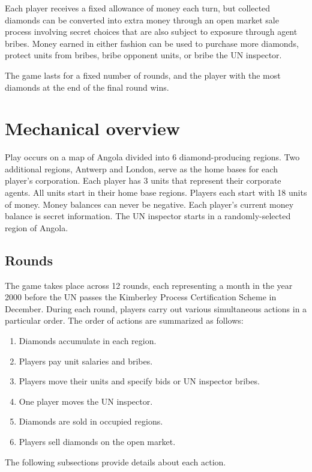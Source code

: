 Each player receives a fixed allowance of money each turn, but collected diamonds can be converted into extra money through an open market sale process involving secret choices that are also subject to exposure through agent bribes.  Money earned in either fashion can be used to purchase more diamonds, protect units from bribes, bribe opponent units, or bribe the UN inspector.  

The game lasts for a fixed number of rounds, and the player with the most diamonds at the end of the final round wins.


\section{Mechanical overview}

Play occurs on a map of Angola divided into 6 diamond-producing regions.  Two additional regions, Antwerp and London, serve as the home bases for each player's corporation.  Each player has 3 units that represent their corporate agents.  All units start in their home base regions.  Players each start with 18 units of money.  Money balances can never be negative.  Each player's current money balance is secret information.  The UN inspector starts in a randomly-selected region of Angola.


\subsection{Rounds}

The game takes place across 12 rounds, each representing a month in the year 2000 before the UN passes the Kimberley Process Certification Scheme in December.  During each round, players carry out various simultaneous actions in a particular order.  The order of actions are summarized as follows:
\begin{enumerate}

\item Diamonds accumulate in each region.
\item Players pay unit salaries and bribes.
\item Players move their units and specify bids or UN inspector bribes.
\item One player moves the UN inspector.
\item Diamonds are sold in occupied regions.
\item Players sell diamonds on the open market. 
\end{enumerate}
The following subsections provide details about each action.  


